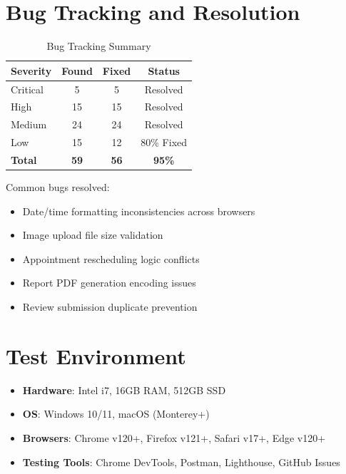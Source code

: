 \section{Bug Tracking and Resolution}

\begin{table}[H]
    \centering
    \small
    \begin{tabular}{|p{2.5cm}|c|c|c|}
        \hline
        \textbf{Severity} & \textbf{Found} & \textbf{Fixed} & \textbf{Status} \\
        \hline
        Critical & 5 & 5 & Resolved \\
        \hline
        High & 15 & 15 & Resolved \\
        \hline
        Medium & 24 & 24 & Resolved \\
        \hline
        Low & 15 & 12 & 80\% Fixed \\
        \hline
        \textbf{Total} & \textbf{59} & \textbf{56} & \textbf{95\%} \\
        \hline
    \end{tabular}
    \caption{Bug Tracking Summary}
    \label{tab:bugs}
\end{table}

Common bugs resolved:
\begin{itemize}
    \item Date/time formatting inconsistencies across browsers
    \item Image upload file size validation
    \item Appointment rescheduling logic conflicts
    \item Report PDF generation encoding issues
    \item Review submission duplicate prevention
\end{itemize}

\section{Test Environment}

\begin{itemize}
    \item \textbf{Hardware}: Intel i7, 16GB RAM, 512GB SSD
    \item \textbf{OS}: Windows 10/11, macOS (Monterey+)
    \item \textbf{Browsers}: Chrome v120+, Firefox v121+, Safari v17+, Edge v120+
    \item \textbf{Testing Tools}: Chrome DevTools, Postman, Lighthouse, GitHub Issues
\end{itemize}

